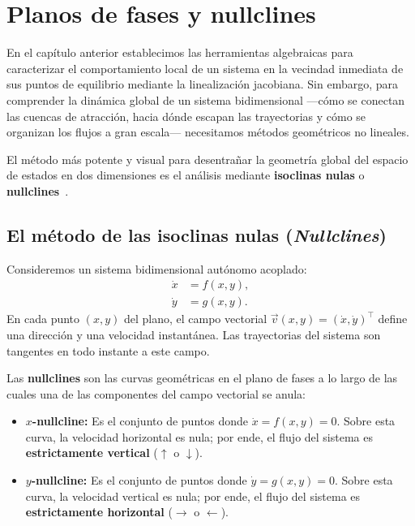 \section{Planos de fases y nullclines}
\label{sec:nullclines}

En el capítulo anterior establecimos las herramientas algebraicas para caracterizar el comportamiento local de un sistema en la vecindad inmediata de sus puntos de equilibrio mediante la linealización jacobiana. Sin embargo, para comprender la dinámica global de un sistema bidimensional ---cómo se conectan las cuencas de atracción, hacia dónde escapan las trayectorias y cómo se organizan los flujos a gran escala--- necesitamos métodos geométricos no lineales.

El método más potente y visual para desentrañar la geometría global del espacio de estados en dos dimensiones es el análisis mediante \textbf{isoclinas nulas} o \textbf{nullclines}~\cite{strogatz2015,edelstein2007}.

\subsection{El método de las isoclinas nulas (\emph{Nullclines})}

Consideremos un sistema bidimensional autónomo acoplado:
\begin{equation}
\begin{aligned}
    \dot{x} &= f(x, y), \\
    \dot{y} &= g(x, y).
\end{aligned}
\label{eq:sistema_2d_general_nullclines}
\end{equation}
En cada punto $(x,y)$ del plano, el campo vectorial $\vec{v}(x,y) = (\dot{x}, \dot{y})^\top$ define una dirección y una velocidad instantánea. Las trayectorias del sistema son tangentes en todo instante a este campo.

\begin{definition}
Las \textbf{nullclines} son las curvas geométricas en el plano de fases a lo largo de las cuales una de las componentes del campo vectorial se anula:
\begin{itemize}
    \item \textbf{$x$-nullcline:} Es el conjunto de puntos donde $\dot{x} = f(x,y) = 0$. Sobre esta curva, la velocidad horizontal es nula; por ende, el flujo del sistema es \textbf{estrictamente vertical} ($\uparrow$ o $\downarrow$).
    \item \textbf{$y$-nullcline:} Es el conjunto de puntos donde $\dot{y} = g(x,y) = 0$. Sobre esta curva, la velocidad vertical es nula; por ende, el flujo del sistema es \textbf{estrictamente horizontal} ($\rightarrow$ o $\leftarrow$).
\end{itemize}
\end{definition}

